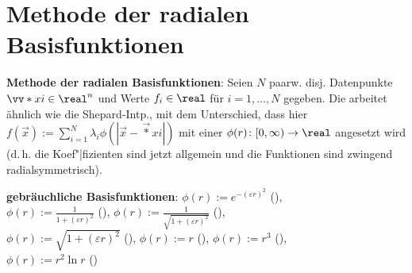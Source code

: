 \pagebreak

\section{%
    Methode der radialen Basisfunktionen%
}

\textbf{Methode der radialen Basisfunktionen}:
Seien $N$ paarw. disj. Datenpunkte $\vec*{x}{i} \in \real^n$ und Werte $f_i \in \real$
für $i = 1, \dotsc, N$ gegeben.
Die  arbeitet ähnlich wie die Shepard-Intp.,
mit dem Unterschied, dass hier $f(\vec{x}) := \sum_{i=1}^N \lambda_i \phi(|\vec{x} - \vec*{x}{i}|)$
mit einer  $\phi(r)\colon [0, \infty) \to \real$
angesetzt wird (d.\,h. die Koef"|fizienten sind jetzt allgemein und
die Funktionen sind zwingend radialsymmetrisch).

\textbf{gebräuchliche Basisfunktionen}:
$\phi(r) := e^{-(\varepsilon r)^2}$
(),\\
$\phi(r) := \frac{1}{1 + (\varepsilon r)^2}$
(),
$\phi(r) := \frac{1}{\sqrt{1 + (\varepsilon r)^2}}$
(),\\
$\phi(r) := \sqrt{1 + (\varepsilon r)^2}$
(),
$\phi(r) := r$
(),
$\phi(r) := r^3$
(),\\
$\phi(r) := r^2 \ln r$
()
%
%
%
%
%
%


